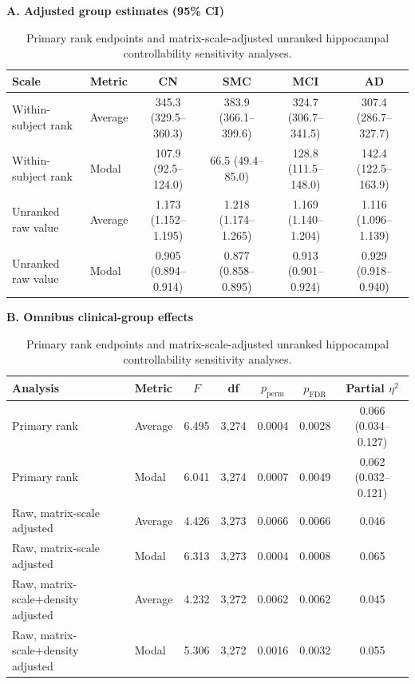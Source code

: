 \documentclass{article}
\begin{document}
\begin{table}[!htbp]
\centering
\caption{Primary rank endpoints and matrix-scale-adjusted unranked hippocampal controllability sensitivity analyses.}
\label{tab:rank_raw_sensitivity}
\scriptsize
\setlength{\tabcolsep}{3.2pt}
\textbf{A. Adjusted group estimates (95\% CI)}\par\vspace{1mm}
\begin{tabular}{llcccc}
\toprule
Scale & Metric & CN & SMC & MCI & AD\\
\midrule
Within-subject rank & Average & 345.3 (329.5--360.3) & 383.9 (366.1--399.6) & 324.7 (306.7--341.5) & 307.4 (286.7--327.7)\\
Within-subject rank & Modal & 107.9 (92.5--124.0) & 66.5 (49.4--85.0) & 128.8 (111.5--148.0) & 142.4 (122.5--163.9)\\
Unranked raw value & Average & 1.173 (1.152--1.195) & 1.218 (1.174--1.265) & 1.169 (1.140--1.204) & 1.116 (1.096--1.139)\\
Unranked raw value & Modal & 0.905 (0.894--0.914) & 0.877 (0.858--0.895) & 0.913 (0.901--0.924) & 0.929 (0.918--0.940)\\
\bottomrule
\end{tabular}

\vspace{3mm}
\textbf{B. Omnibus clinical-group effects}\par\vspace{1mm}
\begin{tabular}{llccccc}
\toprule
Analysis & Metric & $F$ & df & $p_{\mathrm{perm}}$ & $p_{\mathrm{FDR}}$ & Partial $\eta^2$\\
\midrule
Primary rank & Average & 6.495 & 3,274 & 0.0004 & 0.0028 & 0.066 (0.034--0.127)\\
Primary rank & Modal & 6.041 & 3,274 & 0.0007 & 0.0049 & 0.062 (0.032--0.121)\\
Raw, matrix-scale adjusted & Average & 4.426 & 3,273 & 0.0066 & 0.0066 & 0.046\\
Raw, matrix-scale adjusted & Modal & 6.313 & 3,273 & 0.0004 & 0.0008 & 0.065\\
Raw, matrix-scale+density adjusted & Average & 4.232 & 3,272 & 0.0062 & 0.0062 & 0.045\\
Raw, matrix-scale+density adjusted & Modal & 5.306 & 3,272 & 0.0016 & 0.0032 & 0.055\\
\bottomrule
\end{tabular}


\end{table}
\end{document}
